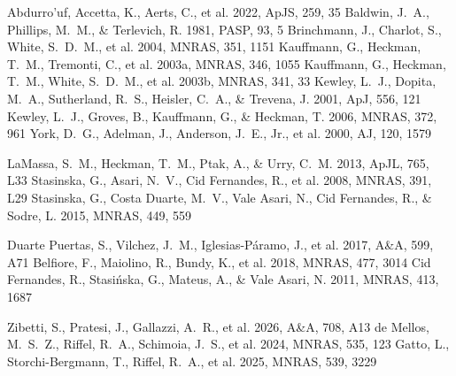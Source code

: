 \documentclass[twocolumn]{aastex631}
\begin{document}
\begin{thebibliography}{}
 Abdurro'uf, Accetta, K., Aerts, C., et al. 2022, ApJS, 259, 35
 Baldwin, J.~A., Phillips, M.~M., \& Terlevich, R. 1981, PASP, 93, 5
 Brinchmann, J., Charlot, S., White, S.~D.~M., et al. 2004, MNRAS, 351, 1151
 Kauffmann, G., Heckman, T.~M., Tremonti, C., et al. 2003a, MNRAS, 346, 1055
 Kauffmann, G., Heckman, T.~M., White, S.~D.~M., et al. 2003b, MNRAS, 341, 33
 Kewley, L.~J., Dopita, M.~A., Sutherland, R.~S., Heisler, C.~A., \& Trevena, J. 2001, ApJ, 556, 121
 Kewley, L.~J., Groves, B., Kauffmann, G., \& Heckman, T. 2006, MNRAS, 372, 961
 York, D.~G., Adelman, J., Anderson, J.~E., Jr., et al. 2000, AJ, 120, 1579

 LaMassa, S.~M., Heckman, T.~M., Ptak, A., \& Urry, C.~M. 2013, ApJL, 765, L33
 Stasinska, G., Asari, N.~V., Cid Fernandes, R., et al. 2008, MNRAS, 391, L29
 Stasinska, G., Costa Duarte, M.~V., Vale Asari, N., Cid Fernandes, R., \& Sodre, L. 2015, MNRAS, 449, 559

 Duarte Puertas, S., Vilchez, J.~M., Iglesias-Páramo, J., et al. 2017, A\&A, 599, A71
 Belfiore, F., Maiolino, R., Bundy, K., et al. 2018, MNRAS, 477, 3014
 Cid Fernandes, R., Stasińska, G., Mateus, A., \& Vale Asari, N. 2011, MNRAS, 413, 1687

 Zibetti, S., Pratesi, J., Gallazzi, A.~R., et al. 2026, A\&A, 708, A13
 de Mellos, M.~S.~Z., Riffel, R.~A., Schimoia, J.~S., et al. 2024, MNRAS, 535, 123
 Gatto, L., Storchi-Bergmann, T., Riffel, R.~A., et al. 2025, MNRAS, 539, 3229
\end{thebibliography}
\end{document}
